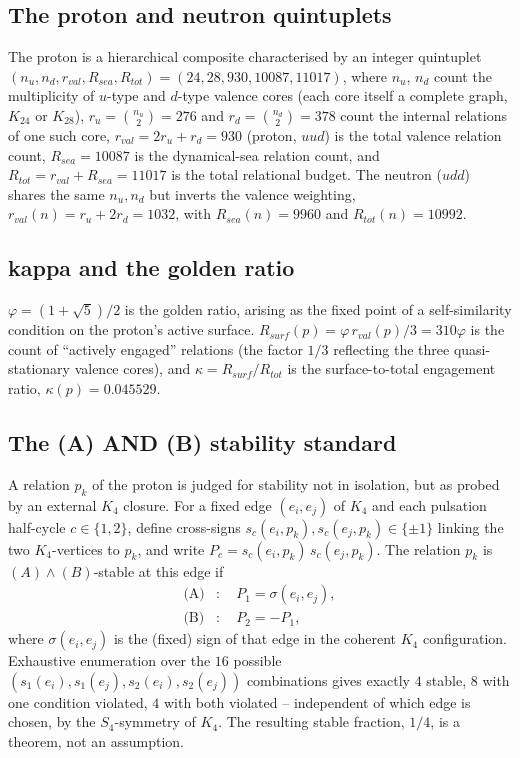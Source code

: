 \documentclass[11pt]{article}
\def\texorpdfstring#1#2{#2}%
\begin{document}
\subsection{The proton and neutron quintuplets}
The proton is a hierarchical composite characterised by an integer quintuplet $(n_u,n_d,r_{val},R_{sea},R_{tot})=(24,28,930,10087,11017)$, where $n_u$, $n_d$ count the multiplicity of $u$-type and $d$-type valence cores (each core itself a complete graph, $K_{24}$ or $K_{28}$), $r_u=\binom{n_u}{2}=276$ and $r_d=\binom{n_d}{2}=378$ count the internal relations of one such core, $r_{val}=2r_u+r_d=930$ (proton, $uud$) is the total valence relation count, $R_{sea}=10087$ is the dynamical-sea relation count, and $R_{tot}=r_{val}+R_{sea}=11017$ is the total relational budget. The neutron ($udd$) shares the same $n_u,n_d$ but inverts the valence weighting, $r_{val}(n)=r_u+2r_d=1032$, with $R_{sea}(n)=9960$ and $R_{tot}(n)=10992$.

\subsection{\texorpdfstring{$\kappa$}{kappa} and the golden ratio}
$\varphi=(1+\sqrt5)/2$ is the golden ratio, arising as the fixed point of a self-similarity condition on the proton's active surface. $R_{surf}(p)=\varphi\,r_{val}(p)/3=310\varphi$ is the count of ``actively engaged'' relations (the factor $1/3$ reflecting the three quasi-stationary valence cores), and $\kappa=R_{surf}/R_{tot}$ is the surface-to-total engagement ratio, $\kappa(p)=0.045529$.

\subsection{The \texorpdfstring{$(A)\wedge(B)$}{(A) AND (B)} stability standard}
\label{subsec:AB}
A relation $p_k$ of the proton is judged for stability not in isolation, but as probed by an external $K_4$ closure. For a fixed edge $(e_i,e_j)$ of $K_4$ and each pulsation half-cycle $c\in\{1,2\}$, define cross-signs $s_c(e_i,p_k),s_c(e_j,p_k)\in\{\pm1\}$ linking the two $K_4$-vertices to $p_k$, and write $P_c=s_c(e_i,p_k)\,s_c(e_j,p_k)$. The relation $p_k$ is $(A)\wedge(B)$-stable at this edge if
\begin{align}
\text{(A)}&: \quad P_1 = \sigma(e_i,e_j), \\
\text{(B)}&: \quad P_2 = -P_1,
\end{align}
where $\sigma(e_i,e_j)$ is the (fixed) sign of that edge in the coherent $K_4$ configuration. Exhaustive enumeration over the $16$ possible $(s_1(e_i),s_1(e_j),s_2(e_i),s_2(e_j))$ combinations gives exactly $4$ stable, $8$ with one condition violated, $4$ with both violated -- independent of which edge is chosen, by the $S_4$-symmetry of $K_4$. The resulting stable fraction, $1/4$, is a theorem, not an assumption.
\end{document}
